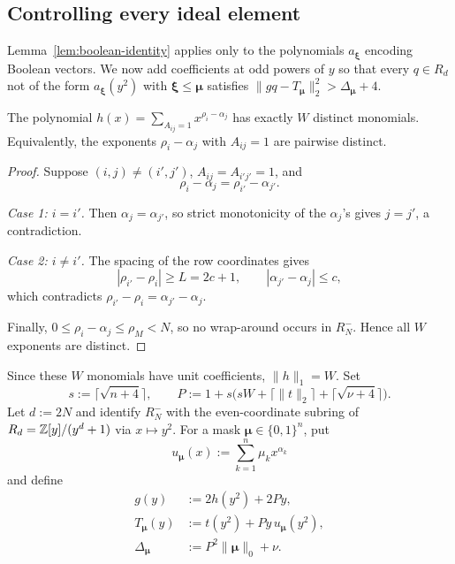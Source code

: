 \subsection{Controlling every ideal element}

Lemma~\ref{lem:boolean-identity} applies only to the
polynomials \(a_{\boldsymbol\xi}\) encoding Boolean vectors.  We now add
coefficients at odd powers of \(y\) so that every \(q\in R_d\) not of the
form \(a_{\boldsymbol\xi}(y^2)\) with
\(\boldsymbol\xi\leq\boldsymbol\mu\) satisfies
\(\|gq-T_{\boldsymbol\mu}\|_2^2>\Delta_{\boldsymbol\mu}+4\).

\begin{lemma}
The polynomial \(h(x)=\sum_{A_{ij}=1}x^{\rho_i-\alpha_j}\) has exactly
\(W\) distinct monomials.  Equivalently, the exponents
\(\rho_i-\alpha_j\) with \(A_{ij}=1\) are pairwise distinct.
\end{lemma}

\begin{proof}
Suppose \((i,j)\neq(i',j')\), \(A_{ij}=A_{i'j'}=1\), and
\[
\rho_i-\alpha_j=\rho_{i'}-\alpha_{j'}.
\]

\textit{Case 1: \(i=i'\).}
Then \(\alpha_j=\alpha_{j'}\), so strict monotonicity of the
\(\alpha_j\)'s gives \(j=j'\), a contradiction.

\textit{Case 2: \(i\neq i'\).}
The spacing of the row coordinates gives
\[
|\rho_{i'}-\rho_i|\geq L=2c+1,
\qquad
|\alpha_{j'}-\alpha_j|\leq c,
\]
which contradicts
\(\rho_{i'}-\rho_i=\alpha_{j'}-\alpha_j\).

Finally, \(0\leq\rho_i-\alpha_j\leq\rho_M<N\), so no wrap-around occurs
in \(R_N^-\).  Hence all \(W\) exponents are distinct.
\end{proof}





Since these \(W\) monomials have unit coefficients, \(\|h\|_1=W\).  Set
\[
 s:=\lceil\sqrt{n+4}\rceil,
 \qquad
 P:=1+s\bigl(sW+\lceil\|t\|_2\rceil
                    +\lceil\sqrt{\nu+4}\rceil\bigr).
\]
Let \(d:=2N\) and identify \(R_N^-\) with the even-coordinate subring of
\(R_d=\mathbb Z[y]/(y^d+1)\) via \(x\mapsto y^2\).  For a mask
\(\boldsymbol\mu\in\{0,1\}^n\), put
\[
 u_{\boldsymbol\mu}(x):=\sum_{k=1}^n\mu_kx^{\alpha_k}
\]
and define
\begin{align}
 g(y)&:=2h(y^2)+2Py,                                      \label{eq:generator}\\
 T_{\boldsymbol\mu}(y)&:=t(y^2)+Py\,u_{\boldsymbol\mu}(y^2),
                                                             \label{eq:masked-target}\\
 \Delta_{\boldsymbol\mu}&:=P^2\|\boldsymbol\mu\|_0+\nu.
\label{eq:masked-radius}
\end{align}

